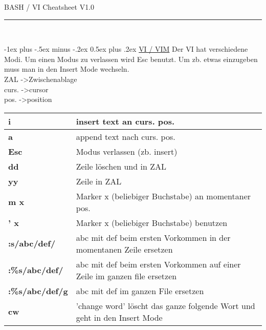 \documentclass[a4paper,10pt,landscape]{article}
\makeatletter
\renewcommand{\section}{\@startsection{section}{1}{0mm}%
                                {-1ex plus -.5ex minus -.2ex}%
                                {0.5ex plus .2ex}%
                                {\normalfont\large\bfseries}}
\makeatother
\begin{document}
\begin{center}
     \Large{BASH / VI Cheatsheet}  \footnotesize{V1.0} \\
\rule{\linewidth}{0.25pt}\\
\end{center}


\raggedright
\begin{multicols}{2}
\footnotesize


\setlength{\premulticols}{1pt}
\setlength{\postmulticols}{1pt}
\setlength{\multicolsep}{1pt}
\setlength{\columnsep}{2pt}

\section{\underline{VI / VIM}}
\vspace{3mm}
Der VI hat verschiedene Modi. Um einen Modus zu verlassen wird Esc benutzt. Um zb. etwas einzugeben muss man in den Insert Mode wechseln.\\
\vspace{2mm}
ZAL -\textgreater Zwischenablage\\
curs. -\textgreater cursor\\
pos. -\textgreater position\\
\vspace{2mm}
\begin{tabular}{l p{8cm}}
{\bf i} & insert text an curs. pos.\\\hline
{\bf a} & append text nach curs. pos.\\\hline
{\bf Esc} & Modus verlassen (zb. insert)\\\hline
{\bf dd} &  Zeile löschen und in ZAL\\\hline
{\bf yy} &  Zeile in ZAL\\\hline
{\bf m x} &  Marker x (beliebiger Buchstabe) an momentaner pos.\\\hline
{\bf ' x} &  Marker x (beliebiger Buchstabe) benutzen\\\hline
{\bf :s/abc/def/} & abc mit def beim ersten Vorkommen in der momentanen Zeile ersetzen\\\hline
{\bf :\%s/abc/def/} & abc mit def beim ersten Vorkommen auf einer Zeile im ganzen file ersetzen\\\hline
{\bf :\%s/abc/def/g} & abc mit def im ganzen File ersetzen\\\hline
{\bf cw} & 'change word' löscht das ganze folgende Wort und geht in den Insert Mode\\\hline

\end{tabular}
\end{multicols}
\end{document}
